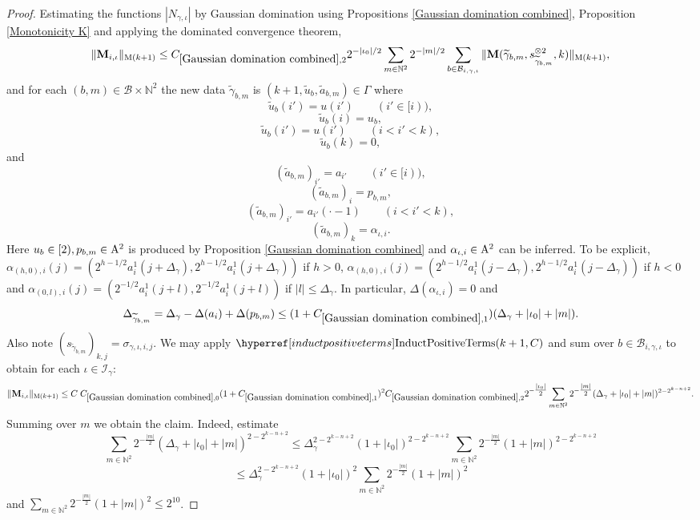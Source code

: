 \documentclass[12pt,reqno]{amsart}
\theoremstyle{plain}
\numberwithin{equation}{section}
\theoremstyle{remark}
\newcommand{\N}{{\mathbb N}}
\newcommand{\M}{\mathbf{M}}
\begin{document}
\begin{proof}
Estimating the functions $|N_{\gamma,\iota}|$ by Gaussian domination using Propositions \ref{Gaussian domination combined}, Proposition \ref{Monotonicity K} and applying the dominated convergence theorem,
\begin{equation}\label{eqn:increasedatapf1}
\|\M_{i,\iota}\|_{{\rm M}(k+1)} \le C_{\ref{Gaussian domination combined},2} 2^{-|\iota_0|/2} \sum_{m\in\mathbb{N}^2} 2^{-|m|/2} \sum_{b\in\mathcal{B}_{i,\gamma,\iota}} \|\M(\widetilde{\gamma}_{b,m}, s_{\widetilde{\gamma}_{b,m}}^{\otimes 2}  ,k)\|_{{\rm M}(k+1)},
\end{equation}
and for each $(b,m)\in\mathcal{B}\times \mathbb{N}^2$ the new data $\widetilde{\gamma}_{b,m}$ is $(k+1,\widetilde{u}_{b},\widetilde{a}_{b,m})\in \Gamma$ where
\[
\widetilde u_b(i')=u(i')\qquad(i'\in[i)),
\]
\[
\widetilde u_b(i)=u_b,
\]
\[
\widetilde u_b(i')=u(i')\qquad(i<i'<k),
\]
\[
\widetilde u_b(k)=0,
\]
and
\[
(\widetilde a_{b,m})_{i'}=a_{i'}\qquad(i'\in[i)),
\]
\[
(\widetilde a_{b,m})_i=p_{b,m},
\]
\[
(\widetilde a_{b,m})_{i'}=a_{i'}(\cdot-1)\qquad(i<i'<k),
\]
\[
(\widetilde a_{b,m})_k=\alpha_{\iota,i}.
\]
Here $u_b\in [2), p_{b,m}\in {\rm A}^2$ is produced by Proposition \ref{Gaussian domination combined} and
$\alpha_{\iota,i}\in {\rm A}^2$ can be inferred. To be explicit,
$\alpha_{(h,0),i}(j) = (2^{h-1/2} a_i^1(j+\Delta_{\gamma}),2^{h-1/2} a_i^1(j+\Delta_{\gamma}))$ if $h>0$,
$\alpha_{(h,0),i}(j) = (2^{h-1/2} a_i^1(j-\Delta_{\gamma}),2^{h-1/2} a_i^1(j-\Delta_{\gamma}))$ if $h<0$ and
$\alpha_{(0,l),i}(j) = (2^{-1/2} a_i^1(j+l),2^{-1/2} a_i^1(j+l))$ if $|l|\le \Delta_{\gamma}$.
In particular, $\Delta(\alpha_{\iota,i})=0$ and
\[ \Delta_{\widetilde{\gamma}_{b,m}}=\Delta_\gamma-\Delta(a_i)+\Delta(p_{b,m}) \le  (1+C_{\ref{Gaussian domination combined},1})(\Delta_\gamma+|\iota_0|+|m|). \]
Also note $(s_{\widetilde{\gamma}_{b,m}})_{k,j}=\sigma_{\gamma,\iota,i,j}$.
We may apply $\InductPositiveTerms{k+1,C}$ and sum over $b\in \mathcal{B}_{i,\gamma,\iota}$ to obtain for each $\iota\in\mathcal{I}_{\gamma}$:
\[ \|\M_{i,\iota}\|_{{\rm M}(k+1)} \le C\; C_{\ref{Gaussian domination combined},0} (1+C_{\ref{Gaussian domination combined},1})^2 C_{\ref{Gaussian domination combined},2} 2^{-\tfrac{|\iota_0|}{2}} \sum_{m\in\mathbb{N}^2} 2^{-\tfrac{|m|}{2}} (\Delta_\gamma + |\iota_0|+|m|)^{2-2^{k-n+2}}. \]
Summing over $m$ we obtain the claim.
Indeed, estimate
\[ \sum_{m\in\mathbb{N}^2} 2^{-\tfrac{|m|}{2}} (\Delta_\gamma + |\iota_0|+|m|)^{2-2^{k-n+2}} \le \Delta_\gamma^{2-2^{k-n+2}} (1+|\iota_0|)^{2-2^{k-n+2}} \sum_{m\in\N^2} 2^{-\tfrac{|m|}{2}} (1+|m|)^{2-2^{k-n+2}} \]
\[
\leq \Delta_\gamma^{2-2^{k-n+2}} (1+|\iota_0|)^{2} \sum_{m\in\N^2} 2^{-\tfrac{|m|}{2}} (1+|m|)^{2}
\]
and $\sum_{m\in\N^2} 2^{-\frac{|m|}{2}} (1+|m|)^2\le 2^{10}$.
\end{proof}
\end{document}
